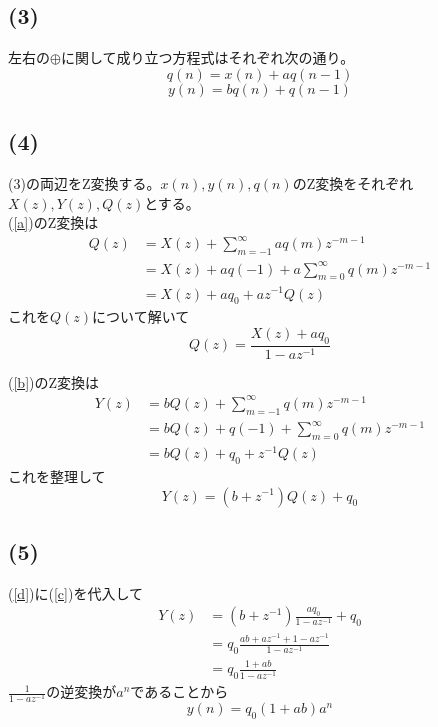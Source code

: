 \documentclass[a4paper,12pt,xelatex,ja=standard]{bxjsarticle}
\begin{document}
  \subsection*{(3)}
  左右の$\oplus$に関して成り立つ方程式はそれぞれ次の通り。
  \begin{equation}
    \label{a}
    q(n) = x(n) + a q(n-1)
  \end{equation}
  \begin{equation}
    \label{b}
    y(n) = b q(n) + q(n-1)
  \end{equation}

  \subsection*{(4)}
  (3)の両辺をZ変換する。$x(n), y(n), q(n)$のZ変換をそれぞれ$X(z), Y(z), Q(z)$とする。\\
  (\ref{a})のZ変換は
  \begin{equation*}
    \begin{split}
      Q(z)
        &= X(z) + \sum^{\infty}_{m=-1}aq(m)z^{-m-1} \\
        &= X(z) + aq(-1) + a \sum^{\infty}_{m=0}q(m)z^{-m-1} \\
        &= X(z) + aq_0 + a z^{-1}Q(z)
    \end{split}
  \end{equation*}
  これを$Q(z)$について解いて
  \begin{equation}
    \label{c}
    Q(z) = \frac{X(z) + aq_0}{1 - az^{-1}}
  \end{equation}

  (\ref{b})のZ変換は
  \begin{equation*}
    \begin{split}
      Y(z)
        &= bQ(z) + \sum^{\infty}_{m=-1}q(m)z^{-m-1} \\
        &= bQ(z) + q(-1) + \sum^{\infty}_{m=0}q(m)z^{-m-1} \\
        &= bQ(z) + q_0 + z^{-1}Q(z)
    \end{split}
  \end{equation*}
  これを整理して
  \begin{equation}
    \label{d}
    Y(z) = (b + z^{-1})Q(z) + q_0
  \end{equation}

  \subsection*{(5)}
  (\ref{d})に(\ref{c})を代入して
  \begin{equation*}
    \begin{split}
      Y(z)
        &= (b + z^{-1})\frac{aq_0}{1 - az^{-1}} + q_0 \\
        &= q_0 \frac{ab + az^{-1} + 1 - az^{-1}}{1 - az^{-1}} \\
        &= q_0 \frac{1 + ab}{1 - az^{-1}}
    \end{split}
  \end{equation*}
  $\frac{1}{1 - az^{-1}}$の逆変換が$a^n$であることから
  \[
    y(n) = q_0 (1 + ab) a^{n}
  \]
\end{document}
